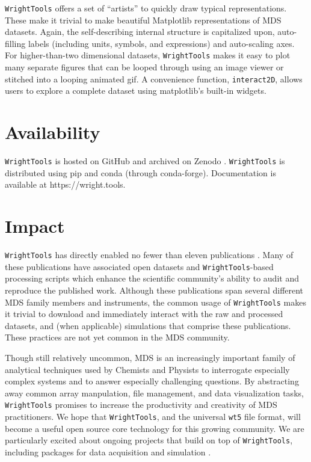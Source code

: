 \texttt{WrightTools} offers a set of ``artists'' to quickly draw typical
representations. These make it trivial to make beautiful Matplotlib
representations of MDS datasets. Again, the self-describing internal
structure is capitalized upon, auto-filling labels (including units,
symbols, and expressions) and auto-scaling axes. For higher-than-two
dimensional datasets, \texttt{WrightTools} makes it easy to plot many
separate figures that can be looped through using an image viewer or
stitched into a looping animated gif. A convenience function,
\texttt{interact2D}, allows users to explore a complete dataset using
matplotlib's built-in widgets.

\hypertarget{availability}{%
\section{Availability}\label{availability}}

\texttt{WrightTools} is hosted on
GitHub\cite{wrighttools-github} and archived
on Zenodo \cite{ThompsonBlaiseJonathan2018WrightTools}.
\texttt{WrightTools} is distributed using
pip\cite{wrighttools-pypi} and
conda\cite{wrighttools-conda} (through
conda-forge). Documentation is available at
https://wright.tools\cite{wrighttools-docs}.

\hypertarget{impact}{%
\section{Impact}\label{impact}}

\texttt{WrightTools} has directly enabled no fewer than eleven
publications \cite{CzechKyleJonathan2015a}\cite{KohlerDanielDavid2017a}
\cite{NeffMallonNathanA2017a}\cite{ChenJie2017a}
\cite{MorrowDarienJames2017a}\cite{HorakErikH2018a}
\cite{SundenKyleFoster2018a}\cite{KohlerDanielDavid2018a}
\cite{HandaliJonathanDaniel2018a}\cite{MorrowDarienJames2018a}
\cite{HandaliJonathanDaniel2018b}.
Many of these publications have
associated open datasets and \texttt{WrightTools}-based processing
scripts which enhance the scientific community's ability to audit and
reproduce the published work. Although these publications span several
different MDS family members and instruments, the common usage of
\texttt{WrightTools} makes it trivial to download and immediately
interact with the raw and processed datasets, and (when applicable)
simulations that comprise these publications. These practices are not
yet common in the MDS community.

Though still relatively uncommon, MDS is an increasingly important
family of analytical techniques used by Chemists and Physists to
interrogate especially complex systems and to answer especially
challenging questions. By abstracting away common array manpulation,
file management, and data visualization tasks, \texttt{WrightTools}
promises to increase the productivity and creativity of MDS
practitioners. We hope that \texttt{WrightTools}, and the universal
\texttt{wt5} file format, will become a useful open source core
technology for this growing community. We are particularly excited about
ongoing projects that build on top of \texttt{WrightTools}, including
packages for data acquisition and simulation
\cite{ThompsonBlaiseJonathan2018PyCMDS}\cite{SundenKyleFoster2018a}.

